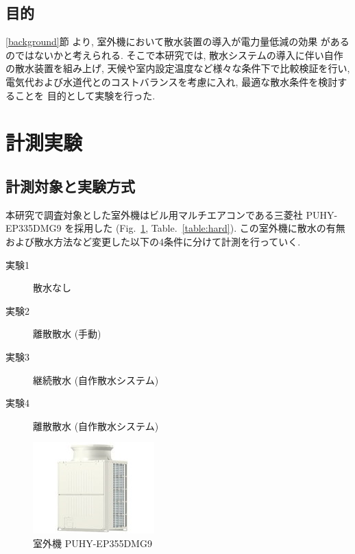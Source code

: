\documentclass[a4j,fleqn,dvipdfmx,uplatex]{jsarticle}
\newcommand{\figref}[1]{Fig.\ \ref{#1}}
\newcommand{\tableref}[1]{Table.\ \ref{#1}}
\newcommand{\subsecref}[1]{\ref{#1}\hspace{0.2zw}節}
\begin{document}
\subsection{目的}\label{purpose}
\subsecref{background} より, 室外機において散水装置の導入が電力量低減の効果
があるのではないかと考えられる. 
そこで本研究では, 散水システムの導入に伴い自作の散水装置を組み上げ, 
天候や室内設定温度など様々な条件下で比較検証を行い, 
電気代および水道代とのコストバランスを考慮に入れ, 最適な散水条件を検討することを
目的として実験を行った. 

\section{計測実験}\label{sec2}
\subsection{計測対象と実験方式}
本研究で調査対象とした室外機はビル用マルチエアコンである三菱社 
PUHY-EP335DMG9 \cite{condensing_unit}を採用した (\figref{fig:condensing_unit}, \tableref{table:hard}). 
この室外機に散水の有無および散水方法など変更した以下の4条件に分けて計測を行っていく.  

\begin{description}
  \item[  実験1 ] 散水なし
  \item[  実験2 ] 離散散水 (手動)
  \item[  実験3 ] 継続散水 (自作散水システム)
  \item[  実験4 ] 離散散水 (自作散水システム)
\end{description}

\begin{figure}[htb]
  \centering
  \includegraphics[width=0.7\linewidth]{img/PUHY-EP335DMG9.jpg}
  \caption{室外機 PUHY-EP355DMG9}
  \label{fig:condensing_unit}
\end{figure}
\end{document}

